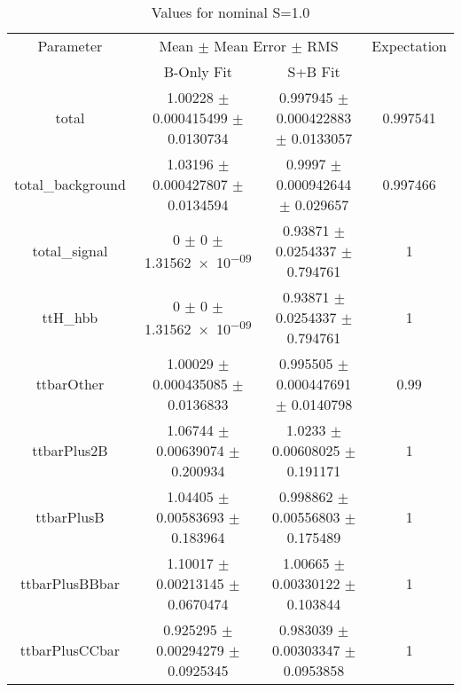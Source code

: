 \begin{table}
\centering
\caption{Values for nominal S=1.0}
\begin{tabular}{cccc}
\toprule
Parameter & \multicolumn{2}{c}{Mean $\pm$ Mean Error $\pm$ RMS} & Expectation\\
 & B-Only Fit & S+B Fit & \\
\midrule
total & \num{1.00228} $\pm$ \num{0.000415499} $\pm$ \num{0.0130734} & \num{0.997945} $\pm$ \num{0.000422883} $\pm$ \num{0.0133057} & \num{0.997541}\\
total\_background & \num{1.03196} $\pm$ \num{0.000427807} $\pm$ \num{0.0134594} & \num{0.9997} $\pm$ \num{0.000942644} $\pm$ \num{0.029657} & \num{0.997466}\\
total\_signal & \num{0} $\pm$ \num{0} $\pm$ \num{1.31562e-09} & \num{0.93871} $\pm$ \num{0.0254337} $\pm$ \num{0.794761} & \num{1}\\
ttH\_hbb & \num{0} $\pm$ \num{0} $\pm$ \num{1.31562e-09} & \num{0.93871} $\pm$ \num{0.0254337} $\pm$ \num{0.794761} & \num{1}\\
ttbarOther & \num{1.00029} $\pm$ \num{0.000435085} $\pm$ \num{0.0136833} & \num{0.995505} $\pm$ \num{0.000447691} $\pm$ \num{0.0140798} & \num{0.99}\\
ttbarPlus2B & \num{1.06744} $\pm$ \num{0.00639074} $\pm$ \num{0.200934} & \num{1.0233} $\pm$ \num{0.00608025} $\pm$ \num{0.191171} & \num{1}\\
ttbarPlusB & \num{1.04405} $\pm$ \num{0.00583693} $\pm$ \num{0.183964} & \num{0.998862} $\pm$ \num{0.00556803} $\pm$ \num{0.175489} & \num{1}\\
ttbarPlusBBbar & \num{1.10017} $\pm$ \num{0.00213145} $\pm$ \num{0.0670474} & \num{1.00665} $\pm$ \num{0.00330122} $\pm$ \num{0.103844} & \num{1}\\
ttbarPlusCCbar & \num{0.925295} $\pm$ \num{0.00294279} $\pm$ \num{0.0925345} & \num{0.983039} $\pm$ \num{0.00303347} $\pm$ \num{0.0953858} & \num{1}\\
\bottomrule
\end{tabular}
\end{table}